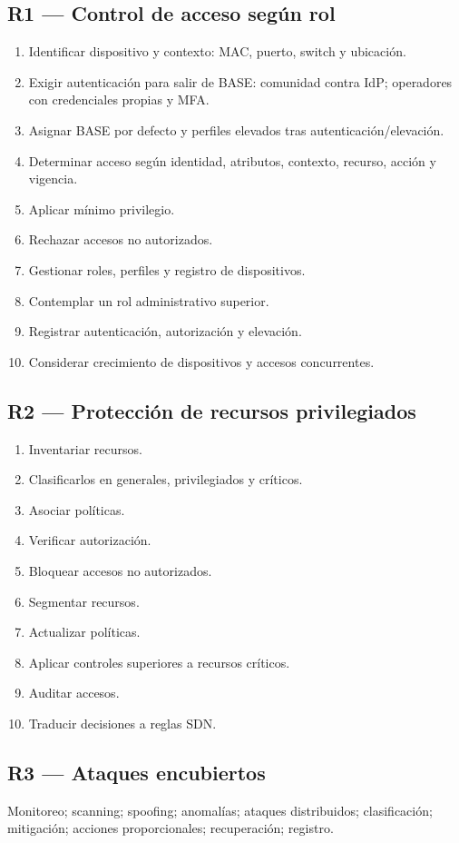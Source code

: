 \documentclass[11pt,a4paper]{article}
\begin{document}
\subsection{R1 --- Control de acceso según rol}
\begin{enumerate}[label=R1.\arabic*.]
\item Identificar dispositivo y contexto: MAC, puerto, switch y ubicación.
\item Exigir autenticación para salir de BASE: comunidad contra IdP; operadores con credenciales propias y MFA.
\item Asignar BASE por defecto y perfiles elevados tras autenticación/elevación.
\item Determinar acceso según identidad, atributos, contexto, recurso, acción y vigencia.
\item Aplicar mínimo privilegio.
\item Rechazar accesos no autorizados.
\item Gestionar roles, perfiles y registro de dispositivos.
\item Contemplar un rol administrativo superior.
\item Registrar autenticación, autorización y elevación.
\item Considerar crecimiento de dispositivos y accesos concurrentes.
\end{enumerate}

\subsection{R2 --- Protección de recursos privilegiados}
\begin{enumerate}[label=R2.\arabic*.]
\item Inventariar recursos.
\item Clasificarlos en generales, privilegiados y críticos.
\item Asociar políticas.
\item Verificar autorización.
\item Bloquear accesos no autorizados.
\item Segmentar recursos.
\item Actualizar políticas.
\item Aplicar controles superiores a recursos críticos.
\item Auditar accesos.
\item Traducir decisiones a reglas SDN.
\end{enumerate}

\subsection{R3 --- Ataques encubiertos}
Monitoreo; scanning; spoofing; anomalías; ataques distribuidos; clasificación; mitigación; acciones proporcionales; recuperación; registro.
\end{document}

